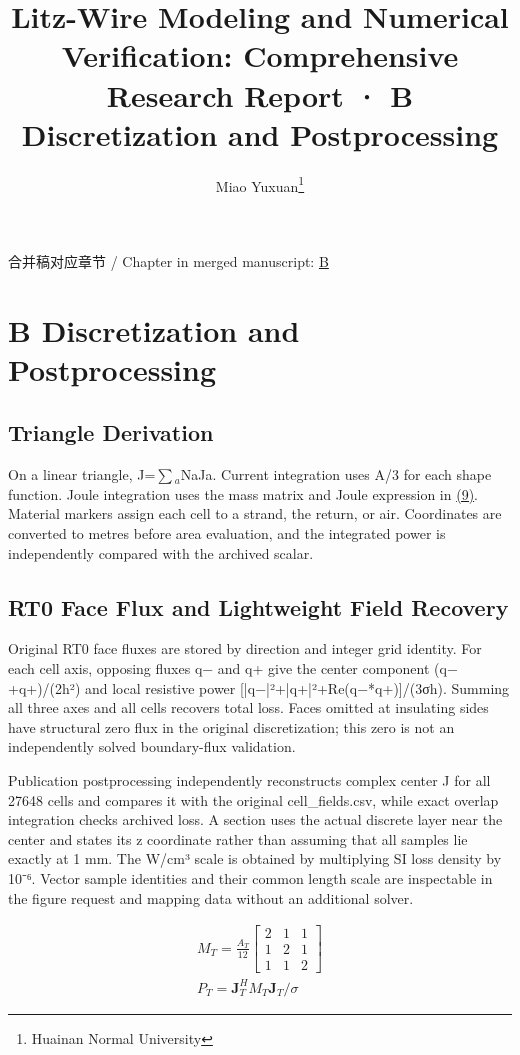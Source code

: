 \documentclass[journal,10pt]{IEEEtran}
\begin{document}
\title{Litz-Wire Modeling and Numerical Verification: Comprehensive Research Report · B Discretization and Postprocessing}
\author{Miao Yuxuan\thanks{Huainan Normal University}}

\maketitle
\noindent 合并稿对应章节 / Chapter in merged manuscript: \href{report_en_ieee.pdf#chapter-B}{B}\par
\FloatBarrier
\section*{B Discretization and Postprocessing}
\hypertarget{chapter-B}{}
\subsection*{Triangle Derivation}
\hypertarget{B.triangle_derivation.heading}{}
On a linear triangle, J=\(\sum\)\(_a\)NaJa. Current integration uses A/3 for each shape function. Joule integration uses the mass matrix and Joule expression in \href{report_en_ieee.pdf#E09}{(9)}. Material markers assign each cell to a strand, the return, or air. Coordinates are converted to metres before area evaluation, and the integrated power is independently compared with the archived scalar.


\subsection*{RT0 Face Flux and Lightweight Field Recovery}
\hypertarget{B.report_rt0.heading}{}
Original RT0 face fluxes are stored by direction and integer grid identity. For each cell axis, opposing fluxes q− and q+ give the center component (q−+q+)/(2h²) and local resistive power [|q−|²+|q+|²+Re(q−*q+)]/(3σh). Summing all three axes and all cells recovers total loss. Faces omitted at insulating sides have structural zero flux in the original discretization; this zero is not an independently solved boundary-flux validation.


Publication postprocessing independently reconstructs complex center J for all 27648 cells and compares it with the original cell\_fields.csv, while exact overlap integration checks archived loss. A section uses the actual discrete layer near the center and states its z coordinate rather than assuming that all samples lie exactly at 1 mm. The W/cm³ scale is obtained by multiplying SI loss density by 10⁻⁶. Vector sample identities and their common length scale are inspectable in the figure request and mapping data without an additional solver.


\hypertarget{E09}{}
\begin{equation}
\begin{gathered}
M_T=\frac{A_T}{12}\begin{bmatrix}2&1&1\\1&2&1\\1&1&2\end{bmatrix} \\
P_T=\mathbf J_T^H M_T\mathbf J_T/\sigma
\end{gathered}
\tag{9}\label{eq:E09}
\end{equation}
\end{document}
